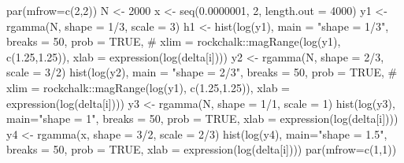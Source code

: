 \begin{Schunk}
\begin{Sinput}
 par(mfrow=c(2,2))
 N <- 2000
 x <- seq(0.0000001, 2, length.out = 4000)
 y1 <- rgamma(N, shape = 1/3, scale = 3)
 h1 <- hist(log(y1), main = "shape = 1/3", breaks = 50,  prob = TRUE,
        #     xlim = rockchalk::magRange(log(y1), c(1.25,1.25)),
             xlab = expression(log(delta[i])))
 y2 <- rgamma(N, shape = 2/3, scale = 3/2)
 hist(log(y2), main = "shape = 2/3", breaks = 50, prob = TRUE,
       # xlim = rockchalk::magRange(log(y1), c(1.25,1.25)),
             xlab = expression(log(delta[i])))
 y3 <- rgamma(N, shape = 1/1, scale = 1)
 hist(log(y3), main="shape = 1", breaks = 50, prob = TRUE,
        xlab = expression(log(delta[i])))
 y4 <- rgamma(x, shape = 3/2, scale = 2/3)
 hist(log(y4), main="shape = 1.5", breaks = 50, prob = TRUE,
  xlab = expression(log(delta[i])))
 par(mfrow=c(1,1))
\end{Sinput}
\end{Schunk}
